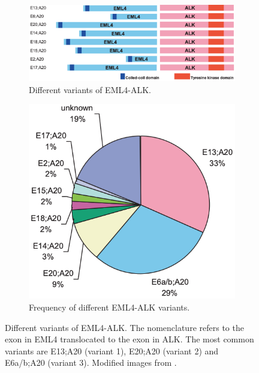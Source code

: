 \begin{figure}[t]
    \centering
    \begin{subfigure}{0.64\textwidth}
        \centering
        \includegraphics[width=\textwidth]{Images/chapter_1/variants_EML4-ALK.png}
        \caption{Different variants of EML4-ALK.}
        \label{fig:EML4-ALK_variants}
    \end{subfigure}
    \hfill
    \begin{subfigure}{0.34\textwidth}
        \centering
        \includegraphics[width=\textwidth]{Images/chapter_1/frequency_variants_EML4-ALK.png}
        \caption{Frequency of different EML4-ALK variants.}
        \label{fig:EML4-ALK_frequency}
    \end{subfigure}
    \caption{Different variants of EML4-ALK. The nomenclature refers to the exon in EML4 translocated to the exon in ALK. The most common variants are E13;A20 (variant 1), E20;A20 (variant 2) and E6a\slash b;A20 (variant 3). Modified images from \cite{EML4_ALK_biology}.}
    \label{fig:EML4-ALK}
\end{figure}

